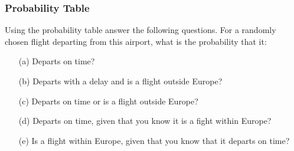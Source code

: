 \documentclass{beamer}
\begin{document}
 

\begin{frame}
\frametitle{Probability Table}

Using the probability table answer the following questions.
\bigskip
For a randomly chosen flight departing from this airport, what is the probability that it: 
\begin{itemize}
\item[(a)] Departs on time? 
\item[(b)] Departs with a delay and is a flight outside Europe? 
\item[(c)] Departs on time or is a flight outside Europe? 
\item[(d)] Departs on time, given that you know it is a fight within Europe? 
\item[(e)] Is a flight within Europe, given that you know that it departs on time?
\end{itemize}
\end{frame}
\end{document}

